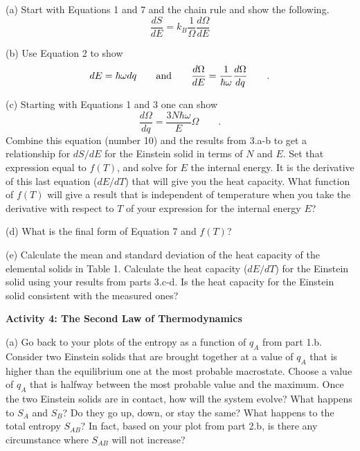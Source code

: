 (a) Start with Equations 1 and 7 and the chain rule and show the following.
\begin{equation}
\frac{dS}{dE} = k_B \frac{1}{\Omega} \frac{d\Omega}{dE}
\end{equation}
\vspace{15mm}

(b) Use Equation 2 to show 
\begin{equation}
dE = \hbar \omega dq \qquad {\rm and} \qquad  
    \frac{d\Omega}{dE}=\frac{1}{\hbar\omega} \frac{d\Omega}{dq}
\qquad .
\end{equation}
\vspace{15mm}

\newpage

(c) Starting with Equations 1 and 3 one can show
\begin{equation}
\frac{d\Omega}{dq} = \frac{3N\hbar \omega}{E} \Omega
\qquad .
\end{equation}
Combine this equation (number 10) and the  results from 3.a-b to 
get a relationship for $dS/dE$ for the Einstein solid in terms
of $N$ and $E$.
Set that expression equal to $f(T)$,
and solve for $E$ the internal energy.
It is the derivative of this last equation ($dE/dT$) that will give you the heat capacity.
What function of $f(T)$ will give a result that is independent of temperature when you
take the derivative with respect to $T$ of your expression for the internal energy $E$?
\vspace{45mm}

(d)  What is the final form of Equation 7 and $f(T)$?
\vspace{15mm}

(e) Calculate the mean and standard deviation of the heat capacity of the elemental solids in
Table 1.
Calculate the heat capacity ($dE/dT$) for the Einstein solid using your results from
parts 3.c-d.
Is the heat capacity for the Einstein solid consistent with the measured ones?
\vspace{45mm}


\textbf{Activity 4: The Second Law of Thermodynamics}

(a) Go back to your plots of the entropy as a function of $q_A$ from part 1.b. 
Consider two Einstein solids that are brought together at a value of $q_A$ that is higher
than the equilibrium one at the most probable macrostate.
Choose a value of $q_A$ that is halfway between the most probable value and the maximum.
Once the two Einstein solids are in contact, how will the system evolve?
What happens to $S_A$ and $S_B$? Do they go up, down, or stay the same?
What happens to the total entropy $S_{AB}$?
In fact, based on your plot from part 2.b, is there any circumstance where
$S_{AB}$ will not increase?
\vspace{30mm}

